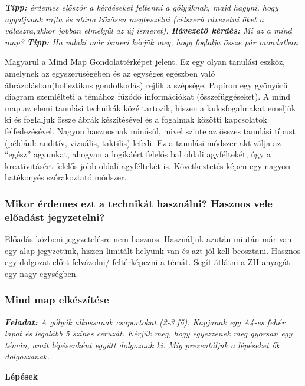 \documentclass[../Main.tex]{subfiles}
\begin{document}
\textit{\textbf{Tipp:} érdemes először a kérdéseket feltenni a gólyáknak, majd hagyni,
 hogy agyaljanak rajta és utána közösen megbeszélni 
(célszerű rávezetni őket a válaszra,akkor jobban elmélyül az új ismeret).} \newline
 \textit{\textbf{Rávezető kérdés:} Mi az a mind map?} \newline
\textit{\textbf{Tipp:} Ha valaki már ismeri kérjük meg, hogy foglalja össze pár mondatban}

Magyarul a Mind Map Gondolattérképet jelent. Ez egy olyan tanulási eszköz, amelynek az egyszerűségében és
az egységes egészben való ábrázolásban(holisztikus gondolkodás) rejlik a szépsége. Papíron egy gyönyörű
diagram szemlélteti a témához fűződő információkat (összefüggéseket).
A mind map az elemi tanulási technikák közé tartozik, hiszen a kulcsfogalmakat emeljük ki
és foglaljuk össze ábrák készítésével és a fogalmak közötti kapcsolatok felfedezésével.
Nagyon hasznosnak minősül, mivel szinte az összes tanulási típust (például: auditív, vizuális, taktilis) lefedi.
Ez a tanulási módszer aktiválja az “egész” agyunkat, ahogyan a logikáért felelős bal oldali agyféltekét,
úgy a kreativitásért felelős jobb oldali agyféltekét is. Következtetés képen egy nagyon hatékonyés szórakoztató módszer.

\subsubsection{Mikor érdemes ezt a technikát használni? \newline Hasznos vele előadást jegyzetelni?}

Előadás közbeni jegyzetelésre nem hasznos.
Használjuk azután miután már van egy alap jegyzetünk, hiszen limitált helyünk van és azt jól kell beosztani.
    Hasznos egy dolgozat előtt felvázolni/ feltérképezni a témát. Segít átlátni a ZH anyagát egy nagy egységben.

\subsubsection{Mind map elkészítése}

\textit{\textbf{Feladat:} A gólyák alkossanak csoportokat (2-3 fő).
Kapjanak egy A4-es fehér lapot és legalább 5 színes ceruzát.
Kérjük meg, hogy egyezzenek meg gyorsan egy témán, amit lépésenként együtt dolgoznak ki.
Míg prezentáljuk a lépéseket ők dolgozzanak.}

\textbf{Lépések}
\end{document}
